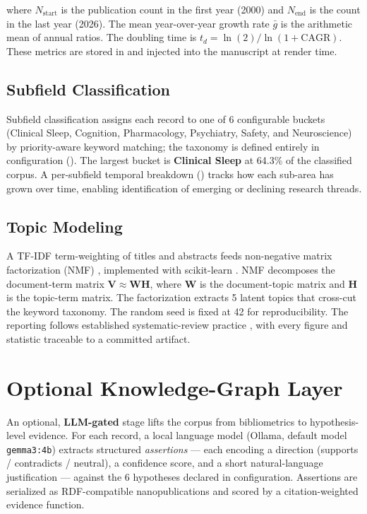 \documentclass[
  english,
]{article}
\begin{document}
where \(N_{\text{start}}\) is the publication count in the first year
(2000) and \(N_{\text{end}}\) is the count in the last year (2026). The
mean year-over-year growth rate \(\bar{g}\) is the arithmetic mean of
annual ratios. The doubling time is
\(t_d = \ln(2) / \ln(1 + \text{CAGR})\). These metrics are stored in
 and injected into the manuscript at
render time.

\subsection{Subfield Classification}\label{subfield-classification}

Subfield classification assigns each record to one of 6 configurable
buckets (Clinical Sleep, Cognition, Pharmacology, Psychiatry, Safety,
and Neuroscience) by priority-aware keyword matching; the taxonomy is
defined entirely in configuration
(). The largest bucket is
\textbf{Clinical Sleep} at 64.3\% of the classified corpus. A
per-subfield temporal breakdown ()
tracks how each sub-area has grown over time, enabling identification of
emerging or declining research threads.

\subsection{Topic Modeling}\label{topic-modeling}

A TF-IDF term-weighting of titles and abstracts \citep{salton1988term}
feeds non-negative matrix factorization (NMF) \citep{lee1999learning},
implemented with scikit-learn \citep{pedregosa2011scikit}. NMF
decomposes the document-term matrix
\(\mathbf{V} \approx \mathbf{W} \mathbf{H}\), where \(\mathbf{W}\) is
the document-topic matrix and \(\mathbf{H}\) is the topic-term matrix.
The factorization extracts 5 latent topics that cross-cut the keyword
taxonomy. The random seed is fixed at 42 for reproducibility. The
reporting follows established systematic-review practice
\citep{page2021prisma}, with every figure and statistic traceable to a
committed artifact.

\newpage

\section{Optional Knowledge-Graph
Layer}\label{optional-knowledge-graph-layer}

An optional, \textbf{LLM-gated} stage lifts the corpus from
bibliometrics to hypothesis-level evidence. For each record, a local
language model (Ollama, default model \texttt{gemma3:4b}) extracts
structured \emph{assertions} --- each encoding a direction (supports /
contradicts / neutral), a confidence score, and a short natural-language
justification --- against the 6 hypotheses declared in configuration.
Assertions are serialized as RDF-compatible nanopublications
\citep{kuhn2016decentralized} and scored by a citation-weighted evidence
function.
\end{document}
